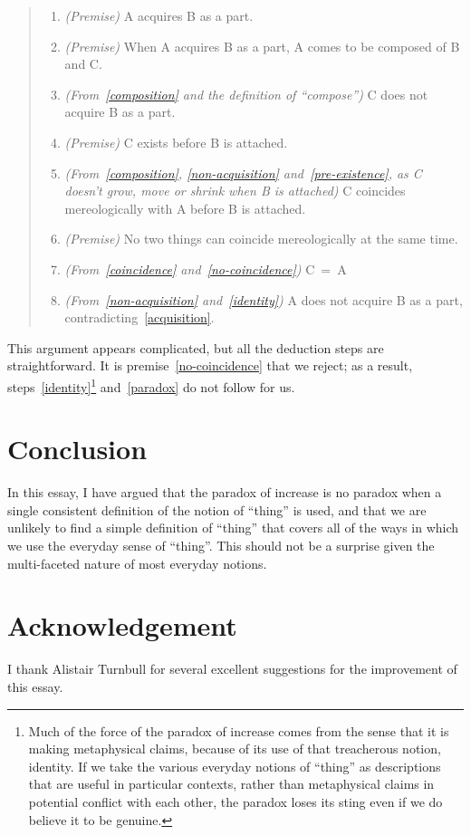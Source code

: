 \documentclass[english,a5paper]{scrartcl}
\begin{document}
\begin{quote}
\begin{enumerate}
\item \emph{(Premise)} A acquires B as a part.
  \label{acquisition}
\item \emph{(Premise)} When A acquires B as a part, A comes to be composed of B and C.
  \label{composition}
\item \emph{(From~\ref{composition} and the definition of “compose”)} C does not acquire B as a part.
  \label{non-acquisition}
\item \emph{(Premise)} C exists before B is attached.
  \label{pre-existence}
\item \emph{(From~\ref{composition}, \ref{non-acquisition} and~\ref{pre-existence}, as C doesn’t grow, move or shrink when B is attached)} C coincides mereologically with A before B is attached.
  \label{coincidence}
\item \emph{(Premise)} No two things can coincide mereologically at the same time.
  \label{no-coincidence}
\item \emph{(From~\ref{coincidence} and~\ref{no-coincidence})} C~=~A
  \label{identity}
\item \emph{(From~\ref{non-acquisition} and~\ref{identity})} A does not acquire B as a part, contradicting~\ref{acquisition}.
  \label{paradox}
\end{enumerate}
\end{quote}

This argument appears complicated, but all the deduction steps are straightforward. It is premise~\ref{no-coincidence} that we reject; as a result, steps~\ref{identity}\footnote{Much of the force of the paradox of increase comes from the sense that it is making metaphysical claims, because of its use of that treacherous notion, identity. If we take the various everyday notions of “thing” as descriptions that are useful in particular contexts, rather than metaphysical claims in potential conflict with each other, the paradox loses its sting even if we do believe it to be genuine.} and~\ref{paradox} do not follow for us.

\section{Conclusion}

In this essay, I have argued that the paradox of increase is no paradox when a single consistent definition of the notion of “thing” is used, and that we are unlikely to find a simple definition of “thing” that covers all of the ways in which we use the everyday sense of “thing”. This should not be a surprise given the multi-faceted nature of most everyday notions.

 \section*{Acknowledgement}

I thank Alistair Turnbull for several excellent suggestions for the improvement of this essay.



\end{document}
